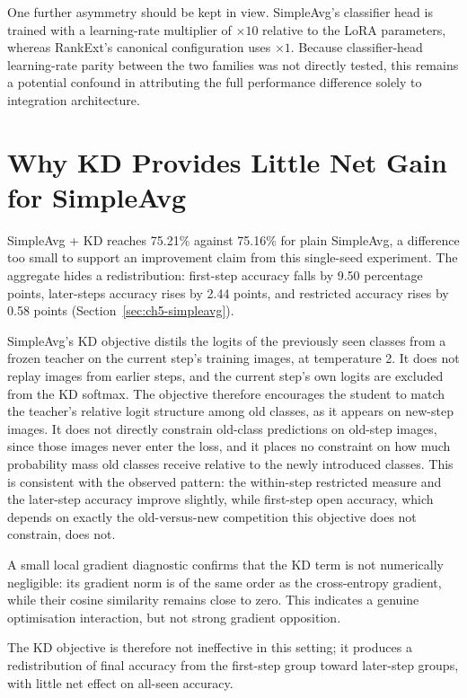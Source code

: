 One further asymmetry should be kept in view. SimpleAvg's classifier head
is trained with a learning-rate multiplier of $\times10$ relative to the
LoRA parameters, whereas RankExt's canonical configuration uses $\times1$.
Because classifier-head learning-rate parity between the two families was
not directly tested, this remains a potential confound in attributing the
full performance difference solely to integration architecture.

\section{Why KD Provides Little Net Gain for SimpleAvg}
\label{sec:ch6-kd-simpleavg}

SimpleAvg + KD reaches 75.21\% against 75.16\% for plain SimpleAvg, a
difference too small to support an improvement claim from this single-seed
experiment. The aggregate hides a redistribution: first-step accuracy
falls by 9.50 percentage points, later-steps accuracy rises by 2.44 points,
and restricted accuracy rises by 0.58 points
(Section~\ref{sec:ch5-simpleavg}).

SimpleAvg's KD objective \parencite{hinton2015distilling} distils the
logits of the previously seen classes from a frozen teacher on the current
step's training images, at temperature 2. It does not replay images from
earlier steps, and the current step's own logits are excluded from the KD
softmax. The objective therefore encourages the student to match the
teacher's relative logit structure among old classes, as it appears on
new-step images. It does not directly constrain old-class predictions on
old-step images, since those images never enter the loss, and it places no
constraint on how much probability mass old classes receive relative to the
newly introduced classes. This is consistent with the observed pattern:
the within-step restricted measure and the later-step accuracy improve
slightly, while first-step open accuracy, which depends on exactly the
old-versus-new competition this objective does not constrain, does not.

A small local gradient diagnostic confirms that the KD term is not
numerically negligible: its gradient norm is of the same order as the
cross-entropy gradient, while their cosine similarity remains close to
zero. This indicates a genuine optimisation interaction, but not strong
gradient opposition.

The KD objective is therefore not ineffective in this setting; it produces
a redistribution of final accuracy from the first-step group toward
later-step groups, with little net effect on all-seen accuracy.

